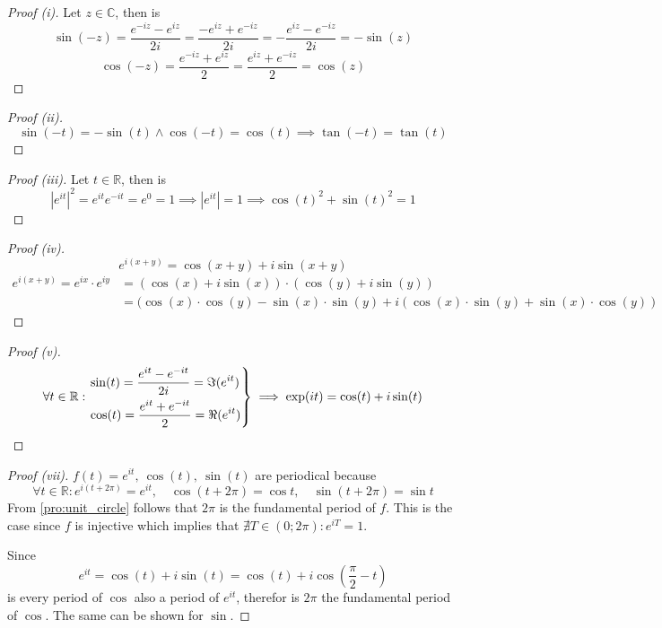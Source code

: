 \documentclass[english,titlepage]{uzhpub}
\theoremstyle{definition}
\theoremstyle{plain}
\theoremstyle{remark}
\theoremstyle{example}
\begin{document}
   \begin{proof}[Proof (i)]
      Let \(z \in \mathbb{C}\), then is
      \[\sin(-z) = \frac{e^{-iz} - e^{iz}}{2i} = \frac{-e^{iz} + e^{-iz}}{2i} = -\frac{e^{iz} - e^{-iz}}{2i} = -\sin(z)\]
      \[\cos(-z) = \frac{e^{-iz} + e^{iz}}{2} = \frac{e^{iz} + e^{-iz}}{2} = \cos(z)\]
   \end{proof}

   \begin{proof}[Proof (ii)]
      \[\sin(-t) = -\sin(t) \land \cos(-t) = \cos(t) \implies \tan(-t) = \tan(t)\]
   \end{proof}

   \begin{proof}[Proof (iii)]
      Let \(t \in \mathbb{R}\), then is
      \[|e^{it}|^2 = e^{it}e^{-it} = e^0 = 1 \implies |e^{it}| = 1 \implies \cos(t)^2 + \sin(t)^2 = 1\]
   \end{proof}

   \begin{proof}[Proof (iv)]
      \[e^{i(x+y)} = \cos(x + y) + i \sin(x + y)\]
      \begin{equation*}
         \begin{split}
            e^{i(x+y)} = e^{ix} \cdot e^{iy} & = (\cos(x) + i\sin(x)) \cdot (\cos(y) + i\sin(y)) \\
                                             & = (\cos(x) \cdot \cos(y) - \sin(x) \cdot \sin(y) + i(\cos(x) \cdot \sin(y) + \sin(x) \cdot \cos(y))
         \end{split}
      \end{equation*}
   \end{proof}

   \begin{proof}[Proof (v)]
      \[\forall t \in \mathbb{R}: \begin{drcases}
         \sin(t) = \frac{e^{it} - e^{-it}}{2i} = \Im(e^{it}) \\
         \cos(t) = \frac{e^{it} + e^{-it}}{2} = \Re(e^{it})\end{drcases}
      \implies \exp(it) = \cos(t) + i\sin(t)\]
   \end{proof}

   \begin{proof}[Proof (vii)]
      \(f(t) = e^{it},~\cos(t),~\sin(t)\) are periodical because
      \[\forall t \in \mathbb{R}: e^{i(t + 2\pi)} = e^{it}, \quad \cos(t + 2\pi) = \cos t, \quad \sin(t + 2\pi) = \sin t\]
      From \cref{pro:unit_circle} follows that \(2\pi\) is the fundamental period of \(f\).
      This is the case since \(f\) is injective which implies that \(\nexists T \in (0; 2\pi): e^{iT} = 1\).

      Since
      \[e^{it} = \cos(t) + i \sin(t) = \cos(t) + i \cos\left(\frac{\pi}{2} - t\right)\]
      is every period of \(\cos\) also a period of \(e^{it}\), therefor is \(2\pi\) the fundamental period of \(\cos\).
      The same can be shown for \(\sin\).
   \end{proof}
\end{document}
